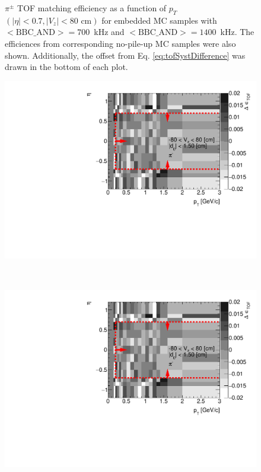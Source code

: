 \begin{figure}[hb]
{	}%
	\caption[$\pi^\pm$ TOF matching efficiency as a function of $p_T$ $\left(|\eta|<0.7, |V_z|<80\text{ cm}\right)$ for embedded MC samples with \mbox{$<\text{BBC\_AND}>=700$~kHz} and \mbox{$<\text{BBC\_AND}>=1400$~kHz}]{$\pi^\pm$ TOF matching efficiency as a function of $p_T$ $\left(|\eta|<0.7, |V_z|<80\text{ cm}\right)$ for embedded MC samples with \mbox{$<\text{BBC\_AND}>=700$~kHz} and \mbox{$<\text{BBC\_AND}>=1400$~kHz}. The efficiences from corresponding no-pile-up MC samples were also shown. Additionally, the offset  from Eq. \ref{eq:tofSystDifference} was drawn in the bottom of each plot.}
	\label{fig:systError1Dtof}
\end{figure}
\begin{figure}[H]
	\centering
	\parbox{0.495\textwidth}{
		\centering
		\includegraphics[width=\linewidth,page=1]{graphics/systematicsEfficiency/bbc_and/tofEffi_d0_1_5_etapt_12D.pdf}\\
	}~
	\parbox{0.495\textwidth}{
		\centering
		\includegraphics[width=\linewidth,page=2]{graphics/systematicsEfficiency/bbc_and/tofEffi_d0_1_5_etapt_12D.pdf}\\
}
\end{figure}

